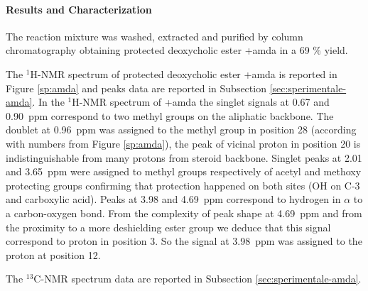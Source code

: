 \paragraph{Results and Characterization}
  The reaction mixture was washed, extracted and purified by column chromatography obtaining protected de\-oxy\-cholic ester \cmpd+{amda} in a 69 \% yield.

  The $^{1}$H-NMR spectrum of protected de\-oxy\-cholic ester \cmpd+{amda} is reported in Figure \ref{sp:amda} and peaks data are reported in Subsection \ref{sec:sperimentale-amda}.
  In the $^{1}$H-NMR spectrum of \cmpd+{amda} the singlet signals at 0.67 and 0.90~ppm correspond to two methyl groups on the aliphatic backbone. The doublet at 0.96~ppm was assigned to the methyl group in position 28 (according with numbers from Figure \ref{sp:amda}), the peak of vicinal proton in position 20 is indistinguishable from many protons from steroid backbone. Singlet peaks at 2.01 and 3.65~ppm were assigned to methyl groups respectively of acetyl and meth\-oxy protecting groups confirming that protection happened on both sites (OH on C-3 and carboxylic acid). Peaks at 3.98 and 4.69~ppm correspond to hydrogen in $\alpha$ to a carbon-oxygen bond. From the complexity of peak shape at 4.69~ppm and from the proximity to a more de\-shielding ester group we deduce that this signal correspond to proton in position 3. So the signal at 3.98~ppm was assigned to the proton at position 12.

  The $^{13}$C-NMR spectrum data are reported in Subsection \ref{sec:sperimentale-amda}.




% 
% 





